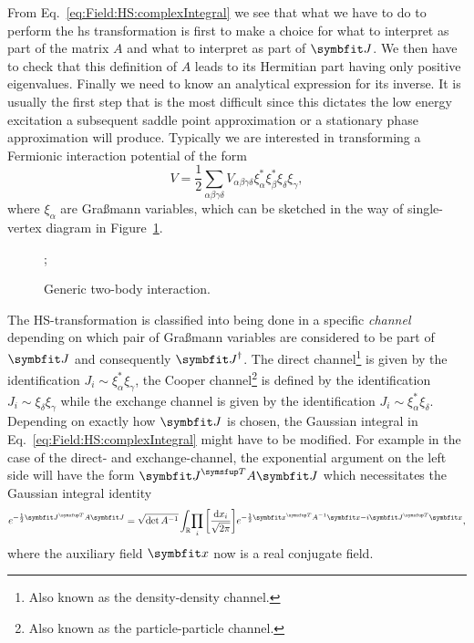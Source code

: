 From Eq.~\eqref{eq:Field:HS:complexIntegral} we see that
what we have to do to perform the \ac{hs} transformation is first to make a choice for what to interpret as part
of the matrix $A$ and what to interpret as part of $\v{J}$. We then have to check that this definition of $A$ leads to its
Hermitian part having only positive eigenvalues. Finally we need to know an analytical expression for its inverse.
It is usually the first step that is the most difficult since this dictates the low energy excitation a subsequent saddle point
approximation or a stationary phase approximation will produce.
Typically we are interested in transforming a Fermionic interaction potential of the form
\begin{equation}
    \label{eq:Field:HS:typicalInteactionPotential}
    V = \frac{1}{2}\sum_{\alpha\beta\gamma\delta}V_{\alpha\beta\gamma\delta}\xi^\ast_\alpha\xi^\ast_\beta\xi_\delta\xi_\gamma,
\end{equation}
where $\xi_\alpha$ are Gra\ss mann variables, which can be sketched in the way of single-vertex diagram in Figure~\ref{fig:Field:HS:twoBodyInteraction}.
\begin{figure}[h]
    \begin{center}

;

    \end{center}
    \caption{Generic two-body interaction.}
    \label{fig:Field:HS:twoBodyInteraction}
\end{figure}
The HS-transformation is classified into being done in a specific \emph{channel} depending on which pair of Gra\ss mann variables are
considered to be part of $\v{J}$ and consequently $\v{J}^\dagger$. The direct channel\footnote{Also known as the density-density channel.} is given by 
the identification $J_i \sim \xi_\alpha^\ast\xi_\gamma$,
the Cooper channel\footnote{Also known as the particle-particle channel.} is defined by the identification $J_i \sim \xi_\delta\xi_\gamma$ while the
exchange channel is given by the identification $J_i \sim \xi_\alpha^\ast\xi_\delta$. Depending on exactly how $\v{J}$ is chosen, the Gaussian
integral in Eq.~\eqref{eq:Field:HS:complexIntegral} might have to be modified. For example in the case of the direct- and exchange-channel, the
exponential argument on the left side will have the form $\v{J}^\trans A\v{J}$ which necessitates the Gaussian integral identity
\begin{equation}
    \label{eq:Field:HS:realIntegral}
    e^{-\frac{1}{2}\v{J}^\trans A\v{J}} = \sqrt{\det A^{-1}}\int_{\mathbb{R}}\!\prod_i\bigg[\frac{\mathrm{d}x_i}{\sqrt{2\pi}}\bigg]e^{-\frac{1}{2}\v{x}^\trans A^{-1}\v{x} - i\v{J}^\trans\v{x}},
\end{equation}
where the auxiliary field $\v{x}$ now is a real conjugate field.


